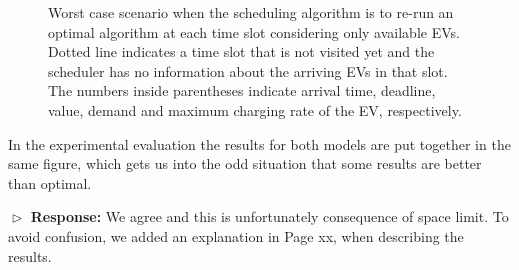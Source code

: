 \documentclass[11pt]{article}
\begin{document}
\begin{figure}
\centering     %
		\hspace{8mm}
\caption{Worst case scenario when the scheduling algorithm is to re-run an optimal algorithm at each time slot considering only available EVs. Dotted line indicates a time slot that is not visited yet and the scheduler has no information about the arriving EVs in that slot. The numbers inside parentheses indicate arrival time, deadline, value, demand and maximum charging rate of the EV, respectively.}
\label{fig:1}
\end{figure}

\vspace{3mm}
{\color{blue} In the experimental evaluation the results for both models are put together in the same figure, which gets us into the odd situation that some results are better than optimal.
 }
\vspace{3mm}

$\vartriangleright$ \noindent\textbf{Response:} 
We agree and this is unfortunately consequence of space limit. To avoid confusion, we added an explanation in Page xx, when describing the results. 
\end{document}
